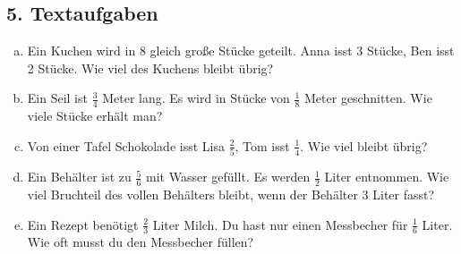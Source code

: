 \subsection*{5. Textaufgaben}
\begin{enumerate}[a)]
    \item Ein Kuchen wird in 8 gleich große Stücke geteilt. Anna isst 3 Stücke, Ben isst 2 Stücke. Wie viel des Kuchens bleibt übrig?
    \item Ein Seil ist $\frac{3}{4}$ Meter lang. Es wird in Stücke von $\frac{1}{8}$ Meter geschnitten. Wie viele Stücke erhält man?
    \item Von einer Tafel Schokolade isst Lisa $\frac{2}{5}$, Tom isst $\frac{1}{4}$. Wie viel bleibt übrig?
    \item Ein Behälter ist zu $\frac{5}{6}$ mit Wasser gefüllt. Es werden $\frac{1}{2}$ Liter entnommen. Wie viel Bruchteil des vollen Behälters bleibt, wenn der Behälter 3 Liter fasst?
    \item Ein Rezept benötigt $\frac{2}{3}$ Liter Milch. Du hast nur einen Messbecher für $\frac{1}{6}$ Liter. Wie oft musst du den Messbecher füllen?
\end{enumerate}

